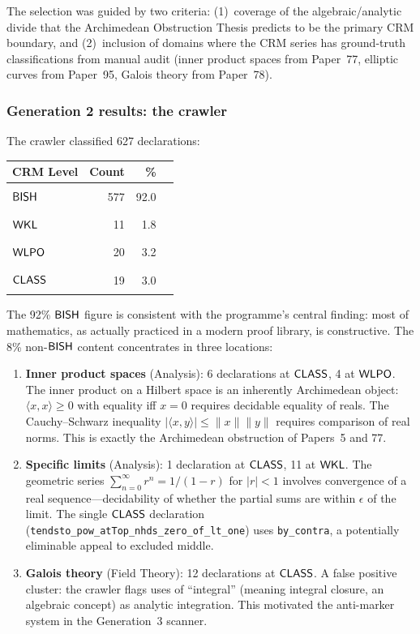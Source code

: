 The selection was guided by two criteria: (1)~coverage of the
algebraic/analytic divide that the Archimedean Obstruction Thesis
predicts to be the primary CRM boundary, and (2)~inclusion of domains
where the CRM series has ground-truth classifications from manual
audit (inner product spaces from Paper~77, elliptic curves from
Paper~95, Galois theory from Paper~78).

\subsubsection{Generation 2 results: the crawler}\label{sec:crawler-results}

The crawler classified 627 declarations:

\begin{center}
\begin{tabular}{lrrl}
\toprule
\textbf{CRM Level} & \textbf{Count} & \textbf{\%} & \\
\midrule
$\textsf{BISH}$  & 577 & 92.0 & \rule{4.6cm}{6pt} \\
$\textsf{WKL}$   &  11 &  1.8 & \rule{0.09cm}{6pt} \\
$\textsf{WLPO}$  &  20 &  3.2 & \rule{0.16cm}{6pt} \\
$\textsf{CLASS}$ &  19 &  3.0 & \rule{0.15cm}{6pt} \\
\bottomrule
\end{tabular}
\end{center}

The 92\% $\textsf{BISH}$ figure is consistent with the programme's central
finding: most of mathematics, as actually practiced in a modern proof
library, is constructive.  The 8\% non-$\textsf{BISH}$ content concentrates
in three locations:

\begin{enumerate}[label=(\roman*)]
\item \textbf{Inner product spaces} (Analysis):
  6 declarations at $\textsf{CLASS}$, 4 at $\textsf{WLPO}$.
  The inner product on a Hilbert space is an inherently Archimedean
  object: $\langle x, x \rangle \geq 0$ with equality iff $x = 0$
  requires decidable equality of reals.  The Cauchy--Schwarz inequality
  $|\langle x, y \rangle| \leq \|x\| \|y\|$ requires comparison of
  real norms.  This is exactly the Archimedean obstruction of Papers~5
  and 77.

\item \textbf{Specific limits} (Analysis):
  1 declaration at $\textsf{CLASS}$, 11 at $\textsf{WKL}$.
  The geometric series $\sum_{n=0}^\infty r^n = 1/(1-r)$ for $|r|<1$
  involves convergence of a real sequence---decidability of whether the
  partial sums are within $\epsilon$ of the limit.  The single $\textsf{CLASS}$
  declaration (\texttt{tendsto\_pow\_atTop\_nhds\_zero\_of\_lt\_one})
  uses \texttt{by\_contra}, a potentially eliminable appeal to
  excluded middle.

\item \textbf{Galois theory} (Field Theory):
  12 declarations at $\textsf{CLASS}$.
  A false positive cluster: the crawler flags uses of ``integral''
  (meaning integral closure, an algebraic concept) as analytic
  integration.  This motivated the anti-marker system in the
  Generation~3 scanner.
\end{enumerate}

